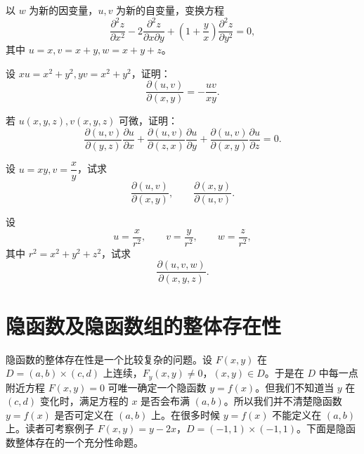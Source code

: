 \begin{xexercise}[9]
以 $w$ 为新的因变量，$u,v$ 为新的自变量，变换方程
  \[
    \frac{\partial^2z}{\partial x^2}
    -2\frac{\partial^2z}{\partial x\partial y}
    +\left(1+\frac yx\right)\frac{\partial^2z}{\partial y^2}=0,
  \]
  其中 $u=x,v=x+y,w=x+y+z$。
\end{xexercise}

\begin{xexercise}[10]
设 $xu=x^2+y^2,yv=x^2+y^2$，证明：
  \[
    \frac{\partial(u,v)}{\partial(x,y)}=-\frac{uv}{xy}.
  \]
\end{xexercise}

\begin{xexercise}[11]
若 $u(x,y,z),v(x,y,z)$ 可微，证明：
  \[
    \frac{\partial(u,v)}{\partial(y,z)}\frac{\partial u}{\partial x}
    +\frac{\partial(u,v)}{\partial(z,x)}\frac{\partial u}{\partial y}
    +\frac{\partial(u,v)}{\partial(x,y)}\frac{\partial u}{\partial z}=0.
  \]
\end{xexercise}

\begin{xexercise}[12]
设 $u=xy,v=\dfrac xy$，试求
  \[
    \frac{\partial(u,v)}{\partial(x,y)},\qquad
    \frac{\partial(x,y)}{\partial(u,v)}.
  \]
\end{xexercise}

\begin{xexercise}[13]
设
  \[
    u=\frac{x}{r^2},\qquad v=\frac{y}{r^2},\qquad w=\frac{z}{r^2},
  \]
  其中 $r^2=x^2+y^2+z^2$，试求
  \[
    \frac{\partial(u,v,w)}{\partial(x,y,z)}.
  \]
\end{xexercise}

\section{隐函数及隐函数组的整体存在性}

隐函数的整体存在性是一个比较复杂的问题。设 $F(x,y)$ 在 $D=(a,b)\times(c,d)$ 上连续，$F_y(x,y)\ne0$，$(x,y)\in D$。于是在 $D$ 中每一点附近方程 $F(x,y)=0$ 可唯一确定一个隐函数 $y=f(x)$。但我们不知道当 $y$ 在 $(c,d)$ 变化时，满足方程的 $x$ 是否会布满 $(a,b)$。所以我们并不清楚隐函数 $y=f(x)$ 是否可定义在 $(a,b)$ 上。在很多时候 $y=f(x)$ 不能定义在 $(a,b)$ 上。读者可考察例子 $F(x,y)=y-2x$，$D=(-1,1)\times(-1,1)$。下面是隐函数整体存在的一个充分性命题。

